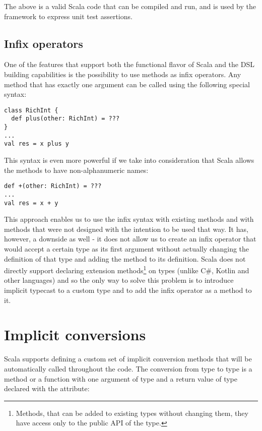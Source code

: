 The above is a valid Scala code that can be compiled and run, and is used by the framework to express unit test assertions.

\subsection{Infix operators}
\label{subsec:infixops}

One of the features that support both the functional flavor of Scala and the DSL building capabilities is the possibility to use methods as infix operators. Any method that has exactly one argument can be called using the following special syntax:

\lstset{style=Scala}
\begin{lstlisting}
class RichInt {
  def plus(other: RichInt) = ???
}
...
val res = x plus y
\end{lstlisting}

This syntax is even more powerful if we take into consideration that Scala allows the methods to have non-alphanumeric names:

\lstset{style=Scala}
\begin{lstlisting}
def +(other: RichInt) = ???
...
val res = x + y
\end{lstlisting}

This approach enables us to use the infix syntax with existing methods and with methods that were not designed with the intention to be used that way. It has, however, a downside as well - it does not allow us to create an infix operator that would accept a certain type as its first argument without actually changing the definition of that type and adding the method to its definition. Scala does not directly support declaring extension methods\footnote{Methods, that can be added to existing types without changing them, they have access only to the public API of the type.} on types (unlike C\#, Kotlin and other languages) and so the only way to solve this problem is to introduce implicit typecast to a custom type and to add the infix operator as a method to it.

\section{Implicit conversions}
\label{sec:implicits}

Scala supports defining a custom set of implicit conversion methods that will be automatically called throughout the code. The conversion from type  to type  is a method or a function with one argument of type  and a return value of type  declared with the  attribute:

